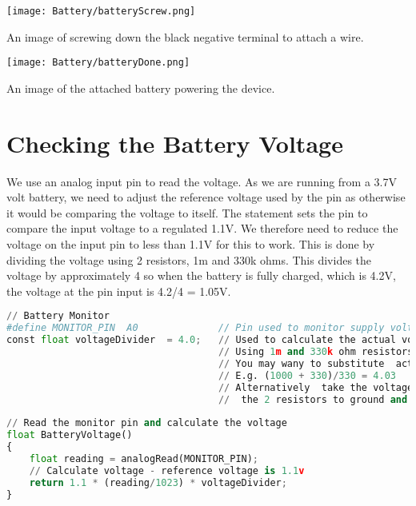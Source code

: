 
\medskip

\begin{center}
  \texttt{[image: Battery/batteryScrew.png]}
\end{center}


An image of screwing down the black negative terminal to attach a wire.

\begin{center}
  \texttt{[image: Battery/batteryDone.png]}
\end{center}

An image of the attached battery powering the device.


\section{Checking the Battery Voltage}

We use an analog input pin to read the voltage. As we are running from a 3.7V volt battery, we need to adjust the reference voltage used by the pin as otherwise it would be comparing the voltage to itself. The statement  sets the pin to compare the input voltage to a regulated 1.1V. We therefore need to reduce the voltage on the input pin to less than 1.1V for this to work. This is done by dividing the voltage using 2 resistors, 1m and 330k ohms. This divides the voltage by approximately 4 so when the battery is fully charged, which is 4.2V, the voltage at the pin input is 4.2/4 = 1.05V. 

\begin{lstlisting}[language=python]
// Battery Monitor
#define MONITOR_PIN  A0              // Pin used to monitor supply voltage
const float voltageDivider  = 4.0;   // Used to calculate the actual voltage fRom the monitor pin reading
                                     // Using 1m and 330k ohm resistors divids the  voltage by approx 4
                                     // You may wany to substitute  actual values of resistors in an equation (R1 + R2)/R2
                                     // E.g. (1000 + 330)/330 = 4.03
                                     // Alternatively  take the voltage reading across the battery and from the joint between 
                                     //  the 2 resistors to ground and divide one by the other to get the value.
    
// Read the monitor pin and calculate the voltage 
float BatteryVoltage()
{ 
    float reading = analogRead(MONITOR_PIN); 
    // Calculate voltage - reference voltage is 1.1v 
    return 1.1 * (reading/1023) * voltageDivider; 
} 
\end{lstlisting}

